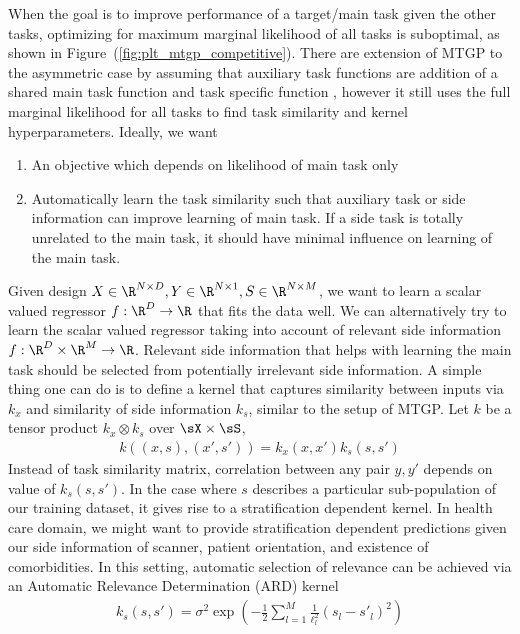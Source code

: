 \documentclass[11pt]{article}
\begin{document}
When the goal is to improve performance of a target/main task given the other tasks, optimizing for maximum marginal likelihood of all tasks is suboptimal, as shown in Figure~(\ref{fig:plt_mtgp_competitive}). There are extension of MTGP to the asymmetric case by assuming that auxiliary task functions are addition of a shared main task function and task specific function \cite{leenFocusedMultitaskLearning2012}, however it still uses the full marginal likelihood for all tasks to find task similarity and kernel hyperparameters. Ideally, we want
\begin{enumerate}
    \item An objective which depends on likelihood of main task only
    \item Automatically learn the task similarity such that auxiliary task or side information can improve learning of main task. If a side task is totally unrelated to the main task, it should have minimal influence on learning of the main task.
\end{enumerate}
Given design $X\in\R^{N\times D}, Y\in \R^{N\times 1}, S\in\R^{N\times M}$, we want to learn a scalar valued regressor $f:\R^D \to \R$ that fits the data well. We can alternatively try to learn the scalar valued regressor taking into account of relevant side information $f:\R^D\times \R^M \to\R$. Relevant side information that helps with learning the main task should be selected from potentially irrelevant side information. A simple thing one can do is to define a kernel that captures similarity between inputs via $k_x$ and similarity of side information $k_s$, similar to the setup of MTGP. Let $k$ be a tensor product $k_x\otimes k_s$ over $\sX\times \sS$, 
\begin{align}
    k((x,s),(x',s'))
        = k_x(x,x') k_s(s,s')
    \label{eq:amtgp_product_kernel}
\end{align}
Instead of task similarity matrix, correlation between any pair $y,y'$ depends on value of $k_s(s,s')$. In the case where $s$ describes a particular sub-population of our training dataset, it gives rise to a stratification dependent kernel. In health care domain, we might want to provide stratification dependent predictions given our side information of scanner, patient orientation, and existence of comorbidities. In this setting, automatic selection of relevance can be achieved via an Automatic Relevance Determination (ARD) kernel
\begin{align}
    k_s(s,s')
        = \sigma^2 \exp\left(
            -\frac{1}{2} \sum_{l=1}^M \frac{1}{\ell_l^2} (s_l - s'_l)^2 
        \right)
    \label{eq:amtgp_ard_kernel}
\end{align}
\end{document}
